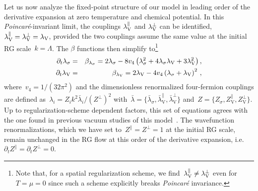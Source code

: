 \documentclass[prd,english,preprintnumbers,amsmath,amssymb,nofootinbib,twocolumn,superscriptaddress]{revtex4-1}
\newcommand{\be}{\begin{eqnarray}}
\newcommand{\ee}{\end{eqnarray}}
\newcommand{\del}{\partial}
\begin{document}
{Let us now analyze the fixed-point structure of our model in leading order of the derivative expansion at
zero temperature and chemical potential. 
In this {\it Poincar\'{e}}-invariant limit, the couplings $\lambda_\text V ^\parallel$ and $\lambda_\text V ^\perp$ can be 
identified,~$\lambda_\text V ^\parallel = \lambda_\text V ^\perp =\lambda_{\text{V}}$, provided the two couplings assume
the same value at the initial RG scale~$k=\Lambda$. 
The $\beta$ functions then simplify to\footnote{Note that, for 
a spatial regularization scheme, we find~$\lambda_{\text V} ^\parallel \neq \lambda_{\text V}^{{\perp}}$ even
for~$T=\mu=0$ since such a scheme explicitly breaks {\it Poincar\'{e}} invariance.} 
%
\be
\del_t \lambda_\sigma &=& \beta _{\lambda _\sigma} = 2 \lambda_\sigma- 8 v_4 \left(  \lambda_\sigma ^2 + 4 \lambda_\sigma  \lambda_\text{V} + 3\lambda_\text{V} ^2 \right),
\label{eq:dtlst0}
\\
\del_t \lambda_\text V &=& \beta _{\lambda _\text{V}} = 2 \lambda _\text{V} 
-4 v_4 \left( \lambda_\sigma + \lambda_\text{V}   \right)^2\,,
\label{eq:dtlvt0}
\ee
%
where~$v_4=1/(32\pi^2)$ and the dimensionless renormalized four-fermion couplings
are defined as~$\lambda_i=Z_i k^2\bar{\lambda}_i/(Z^{\perp})^2$ 
with~$\bar{\lambda}=\{\bar{\lambda}_{\sigma},\bar{\lambda}_{\text{V}}^{\parallel},\bar{\lambda}_{\text{V}}^{\perp}\}$ 
and~$Z=\{ Z_{\sigma}, Z_{\text{V}}^{\parallel}, Z_{\text{V}}^{\perp}\}$.
Up to regularization-scheme dependent factors, this set of equations agrees with the one found in previous 
vacuum studies of this model~\cite{Jaeckel:2002rm,Braun:2011pp}.
The wavefunction renormalizations, which we have set to~$Z^{\parallel}=Z^{\perp}=1$ at the initial RG scale, 
remain unchanged in the RG flow at this order of the derivative expansion, i.e.~$\partial_t Z^{\parallel}=\partial_t Z^{\perp}=0$.

}
\end{document}
